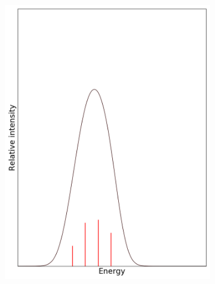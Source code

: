 \documentclass[12pt, fleqn]{beamer}
\begin{document}
\begin{frame}
\begin{overlayarea}{\textwidth}{14cm}
{\begin{figure}[h!]
\begin{subfigure}[b]{0.45\linewidth}
                    \includegraphics[width=\linewidth]{fc_sp/sp_3.png}
                \end{subfigure}
            \end{figure}
        }
\end{overlayarea}
\end{frame}
\end{document}
